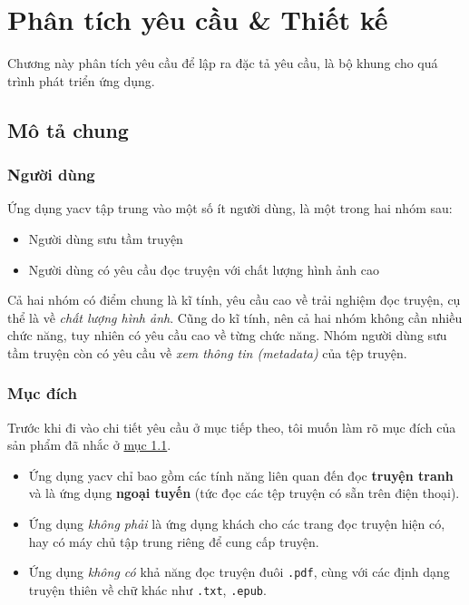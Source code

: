 \documentclass[../../thesis]{subfiles}
\begin{document}
\chapter{Phân tích yêu cầu \& Thiết kế}

Chương này phân tích yêu cầu để lập ra đặc tả yêu cầu, là bộ khung cho quá trình
phát triển ứng dụng.



\section{Mô tả chung}\label{sec:overview}

\subsection{Người dùng}\label{sec:users}

Ứng dụng yacv tập trung vào một số ít người dùng, là một trong hai nhóm sau:

\begin{itemize}
    \item
        Người dùng sưu tầm truyện
    \item
        Người dùng có yêu cầu đọc truyện với chất lượng hình ảnh cao
\end{itemize}

Cả hai nhóm có điểm chung là kĩ tính, yêu cầu cao về trải nghiệm đọc truyện, cụ
thể là về \emph{chất lượng hình ảnh}. Cũng do kĩ tính, nên cả hai nhóm không cần
nhiều chức năng, tuy nhiên có yêu cầu cao về từng chức năng. Nhóm người dùng sưu
tầm truyện còn có yêu cầu về \emph{xem thông tin (metadata)} của tệp truyện.

\subsection{Mục đích}\label{sec:objectives}

Trước khi đi vào chi tiết yêu cầu ở mục tiếp theo, tôi muốn làm rõ mục đích của
sản phẩm đã nhắc ở \protect\hyperlink{P1.1-background}{mục 1.1}.

\begin{itemize}
    \item
        Ứng dụng yacv chỉ bao gồm các tính năng liên quan đến đọc \textbf{truyện
        tranh} và là ứng dụng \textbf{ngoại tuyến} (tức đọc các tệp truyện có
        sẵn trên điện thoại).
    \item
        Ứng dụng \emph{không phải} là ứng dụng khách cho các trang đọc truyện
        hiện có, hay có máy chủ tập trung riêng để cung cấp truyện.
    \item
        Ứng dụng \emph{không có} khả năng đọc truyện đuôi \texttt{.pdf}, cùng
        với các định dạng truyện thiên về chữ khác như \texttt{.txt},
        \texttt{.epub}.
\end{itemize}
\end{document}
